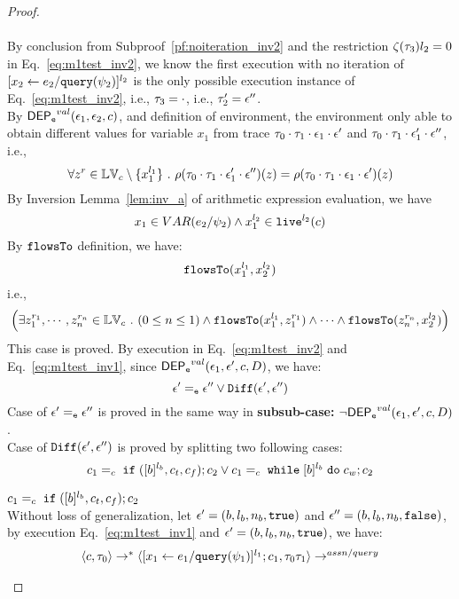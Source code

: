 {\begin{proof}
\[\]
%
\\
By conclusion from Subproof~\ref{pf:noiteration_inv2} and the restriction $\mathtt{\zeta}(\mathtt{\tau}_3) l_2 = 0$ in Eq.~\ref{eq:m1test_inv2}, 
we know
the first execution with no iteration of $[\mathrel{ {x}_2 \leftarrow e_2 / {\tt query}(\psi_2) }]^{l_2}$ 
is the only possible execution instance of Eq.~\ref{eq:m1test_inv2}, i.e., $\mathtt{\tau}_3 = \cdot$, i.e., $\mathtt{\tau}_2' = \mathtt{\epsilon}''$.
\\
By $\mathsf{DEP_{\mathtt{e}}}^{val}(\mathtt{\epsilon}_1, \mathtt{\epsilon}_2, c)$, and definition of environment, 
the environment only able to obtain different values for variable $x_1$ 
from trace $\mathtt{\tau}_0 \cdot \mathtt{\tau}_1 \cdot \mathtt{\epsilon}_1 \cdot \mathtt{\epsilon}'$ and 
$\mathtt{\tau}_0 \cdot \mathtt{\tau}_1 \cdot \mathtt{\epsilon}_1' \cdot \mathtt{\epsilon}''$, i.e.,
\[
  \forall z^r \in \mathbb{LV}_c \setminus \{x_1^{l_1}\} ~.~
  \rho(\mathtt{\tau}_0 \cdot \mathtt{\tau}_1 \cdot \mathtt{\epsilon}_1' \cdot \mathtt{\epsilon}'') (z) =  
  \rho(\mathtt{\tau}_0 \cdot \mathtt{\tau}_1 \cdot \mathtt{\epsilon}_1 \cdot \mathtt{\epsilon}') (z)
\]
By {Inversion Lemma~\ref{lem:inv_a}} of arithmetic expression evaluation, we have 
\[
  x_1 \in VAR(e_2 / \psi_2) \land x_1^{l_2} \in \mathtt{live}^{l_2}(c)
\]
%
By $\mathtt{flowsTo}$ definition, we have:
%
\[
\mathtt{flowsTo}(x_1^{l_1}, {x}_2^{l_2})
\]
i.e.,
%
\[
\Big(\exists z_1^{r_1}, \cdots, z_n^{r_n} \in \mathbb{LV}_{{c}} ~.~ (0 \leq n \leq 1 )
 \land \mathtt{flowsTo}(x_1^{l_1}, z_1^{r_1}) \land \cdots \land \mathtt{flowsTo}(z_n^{r_n}, {x}_2^{l_2}) \Big)
\]
%
This case is proved.
%
%
By execution in Eq.~\ref{eq:m1test_inv2} and Eq.~\ref{eq:m1test_inv1}, since $\mathsf{DEP_{\mathtt{e}}}^{val}(\mathtt{\epsilon}_1, \mathtt{\epsilon}', c, D)$, we have:
\[
  \mathtt{\epsilon}' =_{\mathtt{e}} \mathtt{\epsilon}'' \lor \mathtt{Diff}(\mathtt{\epsilon}', \mathtt{\epsilon}'')
\]
%
Case of $\mathtt{\epsilon}' =_{\mathtt{e}} \mathtt{\epsilon}''$ is proved in the same way in \textbf{subsub-case:} $\neg \mathsf{DEP_{\mathtt{e}}}^{val}(\mathtt{\epsilon}_1, \mathtt{\epsilon}', c, D)$.
\\
Case of $\mathtt{Diff}(\mathtt{\epsilon}', \mathtt{\epsilon}'')$ is proved by splitting two following cases:
\[
  c_1 =_c \;\mathtt{if}\; ([b]^{l_b}, c_t, c_f);{c}_2
  \lor
  c_1 =_c \;\mathtt{while}\; [b]^{l_b} \;\mathtt{do}\; c_w;{c}_2
\]
\begin{subproof} 
%
$c_1 =_c \;\mathtt{if}\; ([b]^{l_b}, c_t, c_f);{c}_2$ 
\\
Without loss of generalization, 
let $\mathtt{\epsilon}' = (b, l_b, n_b, \mathtt{true})$ and
$\mathtt{\epsilon}'' = (b, l_b, n_b, \mathtt{false})$,
by execution Eq.~\ref{eq:m1test_inv1} and $\mathtt{\epsilon}' = (b, l_b, n_b, \mathtt{true})$, we have:
\[
  \begin{array}{l}   
  \langle {c}, \mathtt{\tau}_0 \rangle \rightarrow^{*} 
  \langle [\mathrel{ {x}_1 \leftarrow e_1 / {\tt query}(\psi_1) }]^{l_1} ; {c}_1, \mathtt{\tau}_0 \mathtt{\tau}_1 \rangle  
  \rightarrow^{assn/query}

\end{array}\]
\end{subproof}
\end{proof}}
